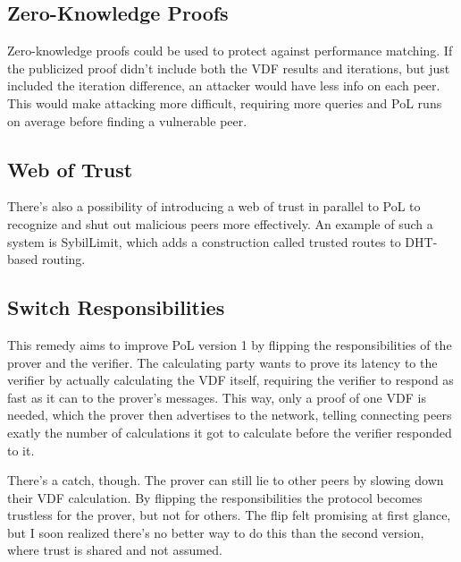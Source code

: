 \subsection{Zero-Knowledge Proofs}
Zero-knowledge proofs could be used to protect against performance matching. If the publicized proof didn't include both the VDF results and iterations, but just included the iteration difference, an attacker would have less info on each peer. This would make attacking more difficult, requiring more queries and PoL runs on average before finding a vulnerable peer.

\subsection{Web of Trust}
There's also a possibility of introducing a web of trust in parallel to PoL to recognize and shut out malicious peers more effectively. An example of such a system is SybilLimit, which adds a construction called trusted routes to DHT-based routing.\cite{yu_sybillimit_2008}

\subsection{Switch Responsibilities}
This remedy aims to improve PoL version 1 by flipping the responsibilities of the prover and the verifier. The calculating party wants to prove its latency to the verifier by actually calculating the VDF itself, requiring the verifier to respond as fast as it can to the prover's messages. This way, only a proof of one VDF is needed, which the prover then advertises to the network, telling connecting peers exatly the number of calculations it got to calculate before the verifier responded to it. 

There's a catch, though. The prover can still lie to other peers by slowing down their VDF calculation. By flipping the responsibilities the protocol becomes trustless for the prover, but not for others. The flip felt promising at first glance, but I soon realized there's no better way to do this than the second version, where trust is shared and not assumed.
